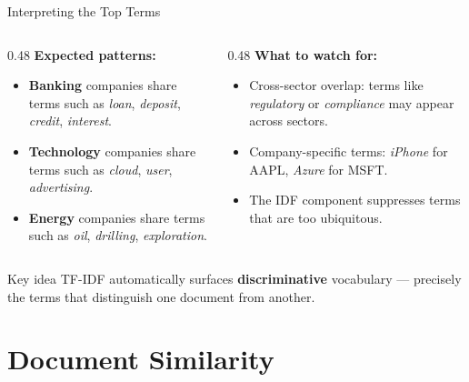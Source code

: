 \documentclass[aspectratio=169,11pt]{beamer}
\begin{document}
\begin{frame}{Interpreting the Top Terms}

\begin{columns}[T]
\begin{column}{0.48\textwidth}
\textbf{Expected patterns:}
\begin{itemize}
  \item \textbf{Banking} companies share terms
        such as \emph{loan}, \emph{deposit},
        \emph{credit}, \emph{interest}.
  \item \textbf{Technology} companies share
        terms such as \emph{cloud}, \emph{user},
        \emph{advertising}.
  \item \textbf{Energy} companies share terms
        such as \emph{oil}, \emph{drilling},
        \emph{exploration}.
\end{itemize}
\end{column}
\begin{column}{0.48\textwidth}
\textbf{What to watch for:}
\begin{itemize}
  \item Cross-sector overlap: terms like
        \emph{regulatory} or \emph{compliance}
        may appear across sectors.
  \item Company-specific terms: \emph{iPhone}
        for AAPL, \emph{Azure} for MSFT.
  \item The IDF component suppresses terms
        that are too ubiquitous.
\end{itemize}
\end{column}
\end{columns}

\vspace{8pt}
\begin{block}{Key idea}
TF-IDF automatically surfaces \textbf{discriminative}
vocabulary --- precisely the terms that distinguish one
document from another.
\end{block}

\end{frame}

\section{Document Similarity}
\end{document}
